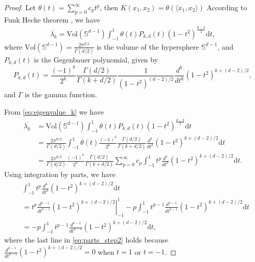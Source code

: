 \begin{proof}
Let $\theta(t)=\sum_{p = 0}^{\infty} c_p t^p$, then $K(x_1,x_2)=\theta(\langle x_1, x_2 \rangle)$
According to Funk Hecke theorem \cite[Section 4.2]{uniform_sphere_data}, we have
\begin{align}
    \overline{\lambda_k} = \mathrm{Vol}(\mathbb{S}^{d-1})\int_{-1}^1 \theta(t)P_{k,d}(t)(1-t^2)^{\frac{d-2}{2}}\mathrm{d}t,
    \label{eq:eigenvalue_k}
\end{align}
where $\mathrm{Vol}(\mathbb{S}^{d-1})=\frac{2 \pi^{d/2}}{\Gamma(d/2)}$ is the volume of the hypersphere $\mathbb{S}^{d-1}$, and $P_{k,d}(t)$ is the Gegenbauer polynomial, given by
\begin{equation*}
    P_{k,d}(t)=\frac{(-1)^k}{2^k}\frac{\Gamma(d/2)}{\Gamma(k+d/2)}\frac{1}{(1-t^2)^{(d-2)/2}}\frac{d^k}{dt^k}(1-t^2)^{k+(d-2)/2},
\end{equation*} 
and $\Gamma$ is the gamma function. 

From \eqref{eq:eigenvalue_k} we have
\begin{align}
\overline{\lambda_k} &= \mathrm{Vol}(\mathbb{S}^{d-1})\int_{-1}^1 \theta(t)P_{k,d}(t)(1-t^2)^{\frac{d-2}{2}}\mathrm{d}t \nonumber\\
&= \frac{2\pi^{d/2}}{\Gamma(d/2)}\int_{-1}^1 \theta(t)\frac{(-1)^k}{2^k}\frac{\Gamma(d/2)}{\Gamma(k+d/2)}\frac{d^k}{dt^k}(1-t^2)^{k+(d-2)/2}\mathrm{d}t \nonumber\\
&= \frac{2\pi^{d/2}}{\Gamma(d/2)}\frac{(-1)^k}{2^k}\frac{\Gamma(d/2)}{\Gamma(k+d/2)}\sum_{p=0}^\infty c_p\int_{-1}^1 t^p\frac{d^k}{dt^k}(1-t^2)^{k+(d-2)/2}\mathrm{d}t.
\label{eq:lambda_k_sum}
\end{align}
Using integration by parts, we have
\begin{align}
    &\int_{-1}^1 t^p\frac{d^k}{dt^k}(1-t^2)^{k+(d-2)/2}\mathrm{d}t \nonumber\\
    &=\left. t^p\frac{d^{k-1}}{dt^{k-1}}(1-t^2)^{k+(d-2)/2}\right|_{-1}^1-p\int_{-1}^1 t^{p-1}\frac{d^{k-1}}{dt^{k-1}}(1-t^2)^{k+(d-2)/2}\mathrm{d}t \nonumber\\
    &=-p\int_{-1}^1 t^{p-1}\frac{d^{k-1}}{dt^{k-1}}(1-t^2)^{k+(d-2)/2}\mathrm{d}t,  
    \label{eq:parts_step2}
\end{align}
where the last line in \eqref{eq:parts_step2} holds because $\frac{d^{k-1}}{dt^{k-1}}(1-t^2)^{k+(d-2)/2}=0$ when $t=1$ or $t=-1$.


\end{proof}
